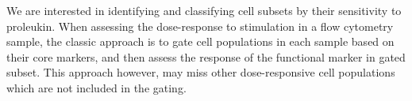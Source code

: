 %

We are interested in identifying and classifying cell subsets by their sensitivity to proleukin.  
When assessing the dose-response to stimulation in a flow cytometry sample,
the classic approach is to gate cell populations in each sample based on their core markers,
and then assess the response of the functional marker in gated subset.
This approach however, may miss other dose-responsive cell populations which are not included in the gating.


